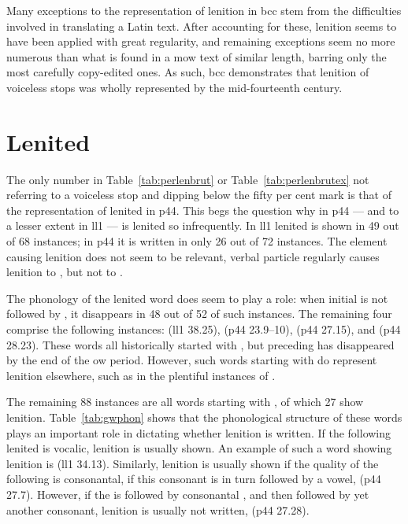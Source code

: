 Many exceptions to the representation of lenition in \gls{bcc} stem from the difficulties involved in translating a Latin text.
After accounting for these, lenition seems to have been applied with great regularity, and remaining exceptions seem no more numerous than what is found in a \gls{mow} text of similar length, barring only the most carefully copy-edited ones.
As such, \gls{bcc} demonstrates that lenition of voiceless stops was wholly represented by the mid-fourteenth century.

\section{Lenited }
\label{sec:lenited-mwg}
The only number in Table~\ref{tab:perlenbrut} or Table~\ref{tab:perlenbrutex} not referring to a voiceless stop and dipping below the fifty per cent mark is that of the representation of lenited  in \gls{p44}.
This begs the question why  in \gls{p44} --- and to a lesser
extent in \gls{ll1} --- is lenited so infrequently.  In \gls{ll1}
lenited  is shown in 49 out of 68 instances; in \gls{p44} it
is written in  only 26 out of 72 instances.  The element causing lenition
does not seem to be relevant, \eg verbal particle  regularly
causes lenition to , but not to .

The phonology of the lenited word does seem to play a role: when
initial  is not followed by , it disappears in 48 out of
52 of such instances. The remaining four comprise the following
instances:  (\gls{ll1} 38.25),
 (\gls{p44} 23.9--10), 
(\gls{p44} 27.15), and  (\gls{p44}
28.23). These words all historically started with , but  \mw{\cw}
preceding  has disappeared by the end of the \gls{ow} period. However, such words
starting with  do represent lenition elsewhere, such as in the
plentiful instances of .

The remaining 88 instances are all words starting with , of which 27 show lenition.
Table~\ref{tab:gwphon} shows that the phonological structure of these words plays an important role in dictating whether lenition is written.
If the  following lenited  is vocalic, lenition is usually shown.
An example of such a word showing lenition is  (\gls{ll1} 34.13).
Similarly, lenition is usually shown if the quality of the following \mw{\cw} is consonantal, if this consonant is in turn followed by a vowel, \eg {} (\gls{p44} 27.7).
However, if the  is followed by consonantal \mw{\cw}, and then followed by yet another consonant, lenition is usually not written, \eg {} (\gls{p44} 27.28).

